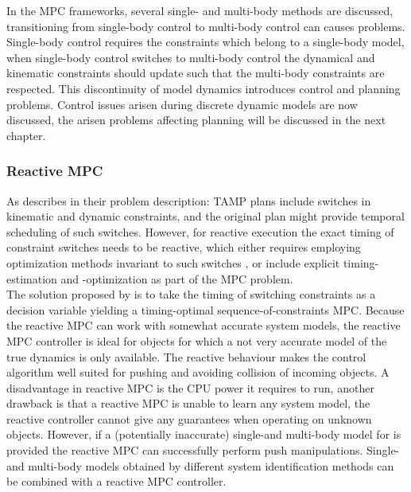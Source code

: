 In the \ac{MPC} frameworks, several single- and multi-body methods are discussed, transitioning from single-body control to multi-body control can causes problems. Single-body control requires the constraints which belong to a single-body model, when single-body control switches to multi-body control the dynamical and kinematic constraints should update such that the multi-body constraints are respected. This discontinuity of model dynamics introduces control and planning problems. Control issues arisen during discrete dynamic models are now discussed, the arisen problems affecting planning will be discussed in the next chapter.\\

\subsubsection*{Reactive \ac{MPC}}
As \cite{toussaint_sequence--constraints_2022} describes in their problem description: \ac{TAMP} plans include switches in kinematic and dynamic constraints, and the original plan might provide temporal scheduling of such switches. However, for reactive execution the exact timing of constraint switches needs to be reactive, which either requires employing optimization methods invariant to such switches \cite{toussaint_differentiable_2019}, \cite{posa_direct_2014} or include explicit timing-estimation and -optimization as part of the \ac{MPC} problem.\\

The solution proposed by \cite{toussaint_sequence--constraints_2022} is to take the timing of switching constraints as a decision variable yielding a timing-optimal sequence-of-constraints \ac{MPC}. Because the reactive \ac{MPC} can work with somewhat accurate system models, the reactive  \ac{MPC} controller is ideal for objects for which a not very accurate model of the true dynamics is only available. The reactive behaviour makes the control algorithm well suited for pushing and avoiding collision of incoming objects. A disadvantage in reactive \ac{MPC} is the CPU power it requires to run, another drawback is that a reactive \ac{MPC} is unable to learn any system model, the reactive controller cannot give any guarantees when operating on unknown objects. However, if a (potentially inaccurate) single-and multi-body model for is provided the reactive \ac{MPC} can successfully perform push manipulations. Single- and multi-body models obtained by different system identification methods can be combined with a reactive \ac{MPC} controller. 

